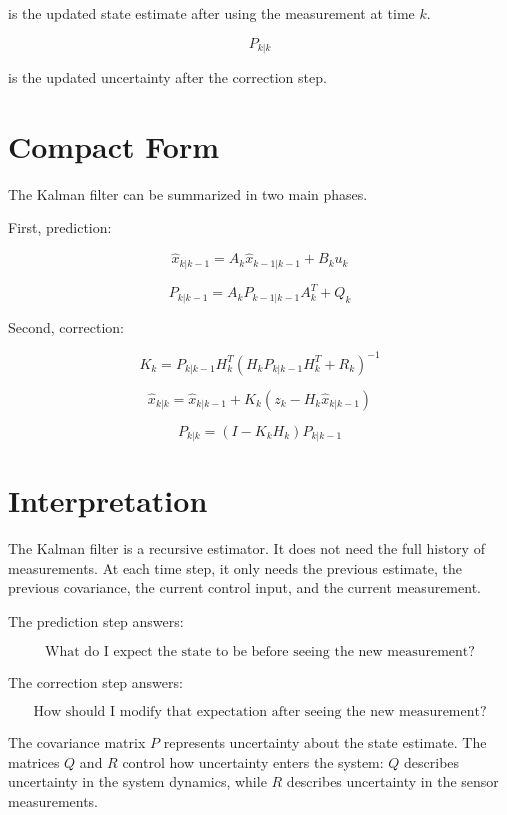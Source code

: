 \documentclass[a4paper]{article}
\begin{document}
        is the updated state estimate after using the measurement at time \(k\).
        
        \[
            P_{k|k}
        \]
        
        is the updated uncertainty after the correction step.
    
    
    \section{Compact Form}
        
        The Kalman filter can be summarized in two main phases.
        
        First, prediction:
        
        \[
            \hat{x}_{k|k-1} = A_k \hat{x}_{k-1|k-1} + B_k u_k
        \]
        
        \[
            P_{k|k-1} = A_k P_{k-1|k-1} A_k^T + Q_k
        \]
        
        Second, correction:
        
        \[
            K_k =
            P_{k|k-1} H_k^T
            \left(
                H_k P_{k|k-1} H_k^T + R_k
            \right)^{-1}
        \]
        
        \[
            \hat{x}_{k|k} =
            \hat{x}_{k|k-1}
            +
            K_k
            \left(
                z_k - H_k \hat{x}_{k|k-1}
            \right)
        \]
        
        \[
            P_{k|k} =
            \left(
                I - K_k H_k
            \right)
            P_{k|k-1}
        \]
    
    
    \section{Interpretation}
        
        The Kalman filter is a recursive estimator.
        It does not need the full history of measurements.
        At each time step, it only needs the previous estimate, the previous covariance, the current control input, and the current measurement.
        
        The prediction step answers:
        
        \[
            \text{What do I expect the state to be before seeing the new measurement?}
        \]
        
        The correction step answers:
        
        \[
            \text{How should I modify that expectation after seeing the new measurement?}
        \]
        
        The covariance matrix \(P\) represents uncertainty about the state estimate.
        The matrices \(Q\) and \(R\) control how uncertainty enters the system: \(Q\) describes uncertainty in the system dynamics, while \(R\) describes uncertainty in the sensor measurements.
        
        
        
\end{document}

